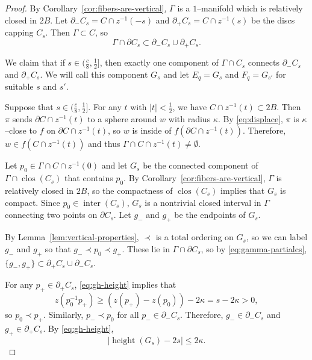 \documentclass[12pt,reqno]{amsart}
\DeclareMathOperator{\height}{height}
\theoremstyle{remark}
\newcommand{\0}{\mathbf{0}}
\renewcommand{\1}{\mathbf 1}
\DeclareMathOperator{\inter}{inter}
\DeclareMathOperator{\closure}{clos}
\begin{document}
\begin{proof}
  By Corollary~\ref{cor:fibers-are-vertical}, $\Gamma$ is a $1$--manifold which is relatively closed in $2B$. Let $\partial_-C_s = C\cap z^{-1}(-s)$ and $\partial_+C_s = C\cap z^{-1}(s)$ be the discs capping $C_s$. Then $\Gamma\subset C$, so
  \begin{equation}\label{eq:gamma-partialcs}
    \Gamma \cap \partial C_s \subset \partial_- C_s \cup \partial_+ C_s.
  \end{equation}

  We claim that if $s\in (\frac{c}{8},\frac{1}{2}]$, then exactly one component of $\Gamma \cap C_s$ connects $\partial_-C_s$ and $\partial_+C_s$. We will call this component $G_s$ and let $E_q = G_s$ and $F_q = G_{s'}$ for suitable $s$ and $s'$.

  Suppose that $s\in (\frac{c}{8},\frac{1}{2}]$. 
  For any $t$ with $|t| < \frac{1}{2}$, we have $C\cap z^{-1}(t)\subset 2B$. Then $\pi$ sends $\partial C\cap z^{-1}(t)$ to a sphere around $w$ with radius $\kappa$. By \eqref{eq:displace}, $\pi$ is $\kappa$--close to $f$ on $\partial C\cap z^{-1}(t)$, so $w$ is inside of $f(\partial C\cap z^{-1}(t))$. Therefore, $w\in f(C\cap z^{-1}(t))$ and thus $\Gamma \cap C\cap z^{-1}(t) \ne\emptyset$.

  Let $p_0 \in \Gamma \cap C \cap z^{-1}(0)$ and let $G_s$ be the connected component of $\Gamma \cap \closure(C_s)$ that contains $p_0$. By Corollary~\ref{cor:fibers-are-vertical}, $\Gamma$ is relatively closed in $2B$, so the compactness of $\closure(C_s)$ implies that $G_s$ is compact. Since $p_0\in \inter(C_s)$, $G_s$ is a nontrivial closed interval in $\Gamma$ connecting two points on $\partial C_s$. Let $g_-$ and $g_+$ be the endpoints of $G_s$.

  By Lemma~\ref{lem:vertical-properties}, $\prec$ is a total ordering on $G_s$, so we can label $g_-$ and $g_+$ so that $g_- \prec p_0 \prec g_+$. These lie in $\Gamma\cap \partial C_s$, so by \eqref{eq:gamma-partialcs}, $\{g_-,g_+\}\subset\partial_+C_s\cup \partial_-C_s$.

  For any $p_+\in \partial_+ C_s$, \eqref{eq:gh-height} implies that
  $$z(p_0^{-1}p_+) \ge (z(p_+) - z(p_0)) - 2\kappa = s - 2\kappa > 0,$$
  so $p_0 \prec p_+$. Similarly, $p_- \prec p_0$ for all $p_-\in \partial_- C_s$. Therefore, $g_-\in \partial_- C_s$ and $g_+ \in \partial_+ C_s$.
  By \eqref{eq:gh-height}, 
  \begin{equation}\label{eq:gs-height}
    |\height(G_s) - 2s| \le 2\kappa.
  \end{equation}
  

\end{proof}
\end{document}
